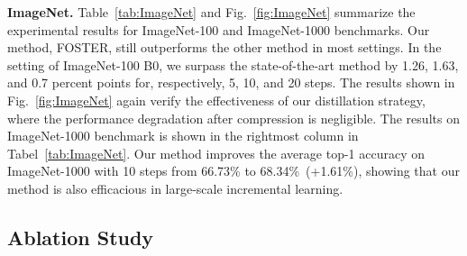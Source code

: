 \documentclass[runningheads]{llncs}
\begin{document}
\noindent\textbf{ImageNet.}
Table~\ref{tab:ImageNet} and Fig.~\ref{fig:ImageNet} summarize the experimental results for ImageNet-100 and ImageNet-1000 benchmarks. Our method, FOSTER, still outperforms the other method in most settings. In the setting of ImageNet-100 B0, we surpass the state-of-the-art method by 1.26, 1.63, and 0.7 percent points for, respectively, 5, 10, and 20 steps. The results shown in Fig.~\ref{fig:ImageNet} again verify the effectiveness of our distillation strategy, where the performance degradation after compression is negligible.  The results on ImageNet-1000 benchmark is shown in the rightmost column in Tabel~\ref{tab:ImageNet}. Our method improves the average top-1 accuracy on ImageNet-1000 with 10 steps from 66.73\% to 68.34\%~(+1.61\%), showing that our method is also efficacious in large-scale incremental learning.




\subsection{Ablation Study}
\end{document}

